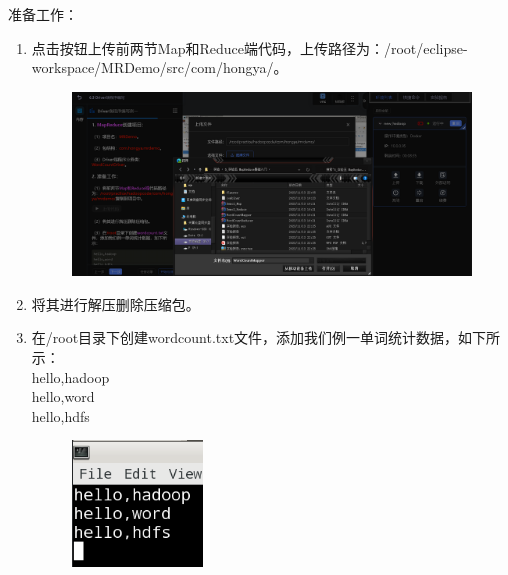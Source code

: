 \documentclass {article}
\begin{document}
				准备工作：
				\begin{enumerate}
					\item 点击按钮上传前两节Map和Reduce端代码，上传路径为：/root/eclipse-workspace/MRDemo/src/com/hongya/。
					\begin{figure}[H]
						\centering
						\includegraphics[width=4.5in]{figures/fig7.5.jpg}
					\end{figure}
				
					\item 将其进行解压删除压缩包。
					\item 在/root目录下创建wordcount.txt文件，添加我们例一单词统计数据，如下所示：\\
					hello,hadoop \\
					hello,word \\
					hello,hdfs
					
					\begin{figure}[H]
						\centering
						\includegraphics{figures/fig8.png}
					\end{figure}
				\end{enumerate}
			
\end{document}
